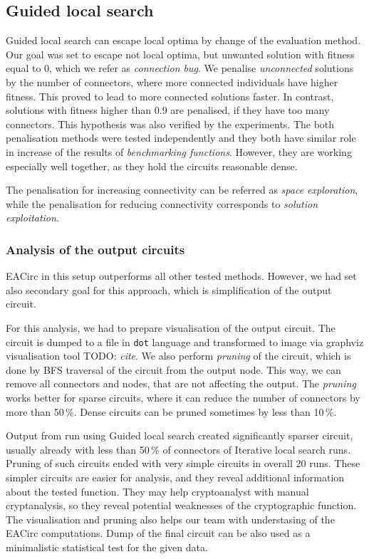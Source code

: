 \documentclass[
  print, %
  Table,   %
  nolof,     %
  nolot,     %
  11pt, %
  oneside  %
]{fithesis3}
\newcommand{\todo}[1]{TODO: \textit{#1}}
\begin{document}
\subsection{Guided local search}
\label{subsec:res-ss-gls}

Guided local search can escape local optima by change of the evaluation method. Our goal was set to escape not local optima, but unwanted solution with fitness equal to 0, which we refer as \textit{connection bug}. We penalise \textit{unconnected} solutions by the number of connectors, where more connected individuals have higher fitness. This proved to lead to more connected solutions faster. In contrast, solutions with fitness higher than 0.9 are penalised, if they have too many connectors. This hypothesis was also verified by the experiments. The both penalisation methods were tested independently and they both have similar role in increase of the results of \textit{benchmarking functions}. However, they are working especially well together, as they hold the circuits reasonable dense.

The penalisation for increasing connectivity can be referred as \textit{space exploration}, while the penalisation for reducing connectivity corresponds to \textit{solution exploitation}.%

\subsubsection{Analysis of the output circuits}
\label{subsubsec:res-ss-gls-circ-anal}

EACirc in this setup outperforms all other tested methods. However, we had set also secondary goal for this approach, which is simplification of the output circuit.

For this analysis, we had to prepare visualisation of the output circuit. The circuit is dumped to a file in \texttt{dot} language and transformed to image via graphviz visualisation tool \todo{cite}. We also perform \textit{pruning} of the circuit, which is done by BFS traversal of the circuit from the output node. This way, we can remove all connectors and nodes, that are not affecting the output. The \textit{pruning} works better for sparse circuits, where it can reduce the number of connectors by more than 50\,\%. Dense circuits can be pruned sometimes by less than 10\,\%.

Output from run using Guided local search created significantly sparser circuit, usually already with less than 50\,\% of connectors of Iterative local search runs. Pruning of such circuits ended with very simple circuits in overall 20 runs. These simpler circuits are easier for analysis, and they reveal additional information about the tested function. They may help cryptoanalyst with manual cryptanalysis, so they reveal potential weaknesses of the cryptographic function. The visualisation and pruning also helps our team with understasing of the EACirc computations. Dump of the final circuit can be also used as a minimalistic statistical test for the given data.
\end{document}
